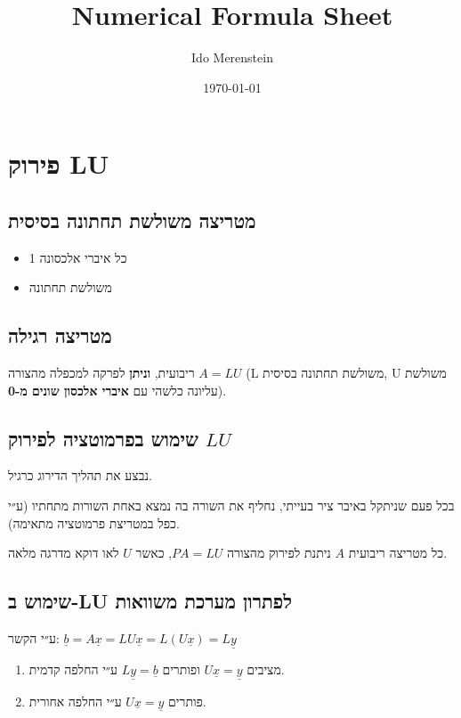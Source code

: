 \documentclass[11pt]{article}
\author{Ido Merenstein}
\date{\today}
\title{Numerical Formula Sheet}
\begin{document}
\maketitle
\tableofcontents



\section{פירוק LU}
\label{sec:orge7cf14a}
\subsection{מטריצה משולשת תחתונה בסיסית}
\label{sec:orgeb94745}
\begin{itemize}
\item כל איברי אלכסונה 1
\item משולשת תחתונה
\end{itemize}

\subsection{מטריצה רגילה}
\label{sec:orge91918e}
ריבועית, \textbf{\textbf{וניתן}} לפרקה למכפלה מהצורה \(A=LU\)
(L משולשת תחתונה בסיסית, U משולשת עליונה כלשהי עם \textbf{\textbf{איברי אלכסון שונים מ-0}}).

\subsection{שימוש בפרמוטציה לפירוק \(LU\)}
\label{sec:orgd211b45}
נבצע את תהליך הדירוג כרגיל.

בכל פעם שניתקל באיבר ציר בעייתי, נחליף את השורה בה נמצא באחת השורות מתחתיו (ע״י כפל במטריצת פרמוטציה מתאימה).

כל מטריצה ריבועית \(A\) ניתנת לפירוק מהצורה \(PA=LU\), כאשר \(U\) לאו דוקא מדרגה מלאה.

\subsection{שימוש ב-LU לפתרון מערכת משוואות}
\label{sec:org8c61e76}
ע״י הקשר: \(\underline{b} = A \underline{x} = LU \underline{x} = L \left( U \underline{x} \right) = L \underline{y}\)

\begin{enumerate}
\item מציבים \(U\underline{x} = \underline{y}\) ופותרים \(L\underline{y} = \underline{b}\) ע״י החלפה קדמית.
\item פותרים \(U\underline{x} = \underline{y}\) ע״י החלפה אחורית.
\end{enumerate}
\end{document}
